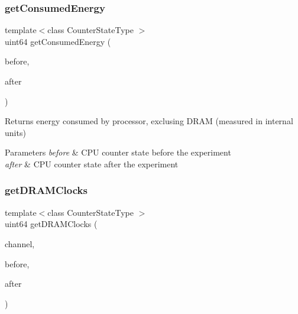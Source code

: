 \subsubsection{\texorpdfstring{get\+Consumed\+Energy}{getConsumedEnergy}}
{\footnotesize\ttfamily template$<$class Counter\+State\+Type $>$ \\
uint64 get\+Consumed\+Energy (\begin{DoxyParamCaption}\item[{const Counter\+State\+Type \&}]{before,  }\item[{const Counter\+State\+Type \&}]{after }\end{DoxyParamCaption})\hspace{0.3cm}{\ttfamily [friend]}}



Returns energy consumed by processor, exclusing D\+R\+AM (measured in internal units) 


\begin{DoxyParams}{Parameters}
{\em before} & C\+PU counter state before the experiment \\
\hline
{\em after} & C\+PU counter state after the experiment \\
\hline
\end{DoxyParams}
\mbox{\label{class_server_uncore_power_state_aeb1baf7feb391c0512dc378a9fd66a17}} 
\subsubsection{\texorpdfstring{get\+D\+R\+A\+M\+Clocks}{getDRAMClocks}}
{\footnotesize\ttfamily template$<$class Counter\+State\+Type $>$ \\
uint64 get\+D\+R\+A\+M\+Clocks (\begin{DoxyParamCaption}\item[{uint32}]{channel,  }\item[{const Counter\+State\+Type \&}]{before,  }\item[{const Counter\+State\+Type \&}]{after }\end{DoxyParamCaption})\hspace{0.3cm}{\ttfamily [friend]}}



